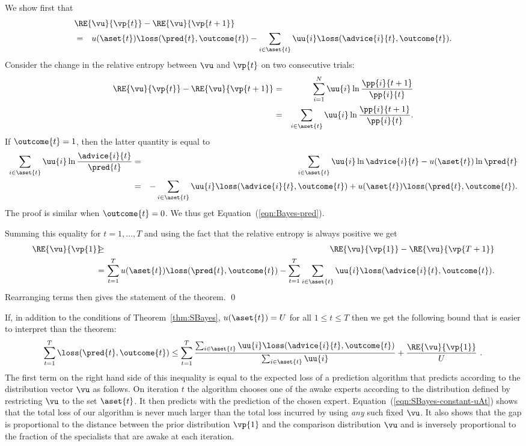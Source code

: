 \proof
We show first that
\begin{eqnarray}
\lefteqn{\RE{\vu}{\vp{t}} - \RE{\vu}{\vp{t+1}}} \nonumber \\
&=&
u(\aset{t}) \loss(\pred{t},\outcome{t})
- \sum_{i \in \aset{t}} \uu{i} \loss(\advice{i}{t},\outcome{t}).
 \label{eqn:Bayes-pred}
\end{eqnarray}
Consider the change in the relative entropy between $\vu$ and $\vp{t}$
on two consecutive trials:
\begin{eqnarray*}
{\RE{\vu}{\vp{t}} - \RE{\vu}{\vp{t+1}}}
&=& \sum_{i=1}^N \uu{i} \ln {\pp{i}{t+1} \over \pp{i}{t}} \\
&=& \sum_{i\in\aset{t}} \uu{i} \ln {\pp{i}{t+1} \over \pp{i}{t}}.
\end{eqnarray*}
If $\outcome{t}=1$, then the latter quantity is equal to
\begin{eqnarray*}
 \sum_{i\in\aset{t}} \uu{i} \ln \frac{\advice{i}{t}}{\pred{t}} &=&
    \sum_{i\in\aset{t}} \uu{i} \ln {\advice{i}{t}} - u(\aset{t})\ln
			\pred{t} \\
  &=& - \sum_{i\in\aset{t}} \uu{i} \loss(\advice{i}{t},\outcome{t})
          + u(\aset{t}) \loss(\pred{t}, \outcome{t}).
\end{eqnarray*}
The proof is similar when $\outcome{t}=0$.
We thus get Equation~(\ref{eqn:Bayes-pred}).

Summing this equality for $t=1,\ldots,T$ and using the fact that the
relative entropy is always positive we get
\begin{eqnarray*}
  \RE{\vu}{\vp{1}}
 \!\!\!\! & \geq & \!\!\!\!
     \RE{\vu}{\vp{1}} - \RE{\vu}{\vp{T+1}}  \\
 \!\!\!\! & = &    \!\!\!\!
\sum_{t=1}^T u(\aset{t}) \loss(\pred{t},\outcome{t})
       -  \sum_{t=1}^T \sum_{i\in\aset{t}} \uu{i} \loss(\advice{i}{t},\outcome{t}).
\end{eqnarray*}
Rearranging terms then gives the statement of the theorem.
\qed

If, in addition to the conditions of Theorem~\ref{thm:SBayes},
$u(\aset{t})=U$ for all $1 \leq t \leq T$ then we get the
following bound that is easier to interpret than the theorem:
\begin{equation} \label{eqn:SBayes-constant-uAt}
\sum_{t=1}^T \loss(\pred{t},\outcome{t})
\leq
\sum_{t=1}^T 
 {\sum_{i \in \aset{t}} \uu{i} \loss(\advice{i}{t},\outcome{t})
  \over
  \sum_{i \in \aset{t}} \uu{i}}
+
{\RE{\vu}{\vp{1}}
 \over 
 U}~.
\end{equation}
The first term on the right hand side of this inequality is equal to
the expected loss of a prediction
algorithm that predicts according to the distribution vector
$\vu$ as follows. On iteration $t$ the algorithm chooses one of
the awake experts according to the distribution defined by restricting
$\vu$ to the set $\aset{t}$. It then predicts with the
prediction of the chosen expert. 
Equation~(\ref{eqn:SBayes-constant-uAt}) shows that the
total loss of our algorithm is never much larger than the total loss
incurred by using {\em any} such fixed $\vu$. It also shows that the
gap is proportional to the distance between 
the prior distribution $\vp{1}$ and the comparison distribution $\vu$
and is inversely proportional to the fraction of the specialists that
are awake at each iteration.

